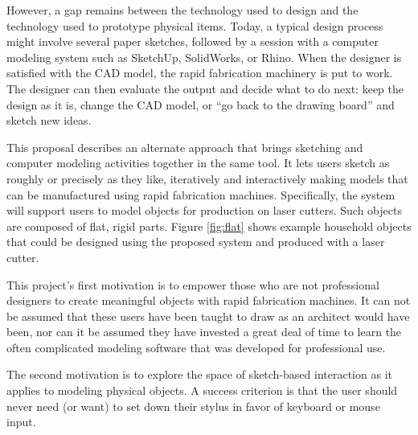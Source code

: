 \documentclass[12pt]{article}
\begin{document}
However, a gap remains between the technology used to design and the
technology used to prototype physical items. Today, a typical design
process might involve several paper sketches, followed by a session
with a computer modeling system such as SketchUp, SolidWorks, or
Rhino. When the designer is satisfied with the CAD model, the rapid
fabrication machinery is put to work. The designer can then evaluate
the output and decide what to do next: keep the design as it is,
change the CAD model, or ``go back to the drawing board'' and sketch
new ideas.

This proposal describes an alternate approach that brings sketching
and computer modeling activities together in the same tool. It lets
users sketch as roughly or precisely as they like, iteratively and
interactively making models that can be manufactured using rapid
fabrication machines. Specifically, the system will support users to
model objects for production on laser cutters. Such objects are
composed of flat, rigid parts. Figure \ref{fig:flat} shows example
household objects that could be designed using the proposed system and
produced with a laser cutter.

This project's first motivation is to empower those who are not
professional designers to create meaningful objects with rapid
fabrication machines. It can not be assumed that these users have been
taught to draw as an architect would have been, nor can it be assumed
they have invested a great deal of time to learn the often complicated
modeling software that was developed for professional use. 

The second motivation is to explore the space of sketch-based
interaction as it applies to modeling physical objects. A success
criterion is that the user should never need (or want) to set down
their stylus in favor of keyboard or mouse input.
\end{document}
